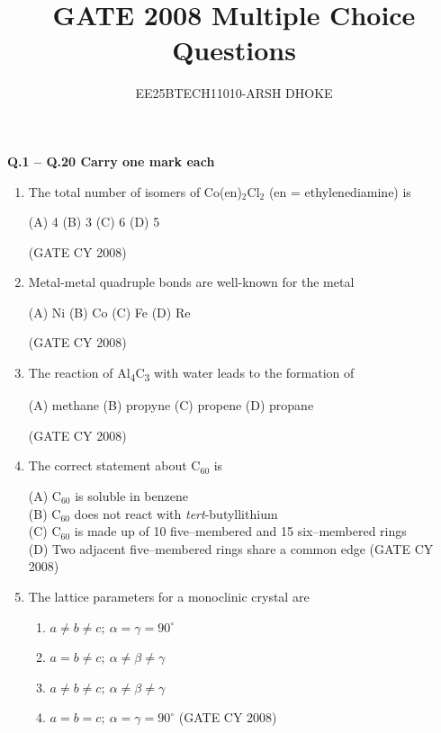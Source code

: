 \documentclass[12pt]{article}
\author{EE25BTECH11010-ARSH DHOKE}
\title{GATE 2008 Multiple Choice Questions}
\date{}
\begin{document}
\maketitle

\textbf{Q.1 -- Q.20 Carry one mark each}

\begin{enumerate}
   \item The total number of isomers of Co(en)$_2$Cl$_2$ (en = ethylenediamine) is
    \begin{multicols}{4}
        (A) 4 \quad (B) 3 \quad (C) 6 \quad (D) 5
    \end{multicols}
    \hfill (GATE CY 2008)

   
    \item   Metal-metal quadruple bonds are well-known for the metal
\begin{multicols}{2}
(A) Ni \quad (B) Co \quad (C) Fe \quad (D) Re \quad  \end{multicols} 
\hfill{(GATE CY 2008)}

    \item The reaction of Al\textsubscript{4}C\textsubscript{3} with water leads to the formation of
    \begin{multicols}{2} (A) methane \quad (B) propyne \quad (C) propene \quad (D) propane  \end{multicols}
\hfill{(GATE CY 2008)}

 \item The correct statement about C$_{60}$ is

        (A) C$_{60}$ is soluble in benzene \\
        (B) C$_{60}$ does not react with \textit{tert}-butyllithium \\
        (C) C$_{60}$ is made up of 10 five–membered and 15 six–membered rings \\
        (D) Two adjacent five–membered rings share a common edge
    \hfill (GATE CY 2008)
    

\item  The lattice parameters for a monoclinic crystal are
\begin{enumerate}
    \item  $a \neq b \neq c; \ \alpha = \gamma = 90^\circ$
    \item  $a = b \neq c; \ \alpha \neq \beta \neq \gamma$
    \item $a \neq b \neq c; \ \alpha \neq \beta \neq \gamma$\
    \item  $a = b = c; \ \alpha = \gamma = 90^\circ$    \hfill{(GATE CY 2008)}
\end{enumerate}
    




\end{enumerate}
\end{document}
